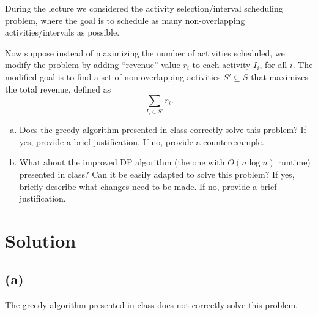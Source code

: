 \documentclass[11pt]{article}
\begin{document}
    \setlength{\headheight}{26pt}
    \pagestyle{fancy}
    \fancyfoot[C]{}
    \fancyfoot[R]{\thepage}
    \renewcommand{\headrulewidth}{0.4pt}
    \renewcommand{\footrulewidth}{0.4pt}
    

    \begin{tcolorbox}[title={Problem 1 (Interval Scheduling with Revenue, 35 pts)}] \setlength\parindent{1em}
        During the lecture we considered the activity selection/interval scheduling problem, where the goal is to schedule as many non-overlapping activities/intervals as possible. 
        
        Now suppose instead of maximizing the number of activities scheduled, we modify the problem by adding ``revenue'' value $r_i$ to each activity $I_i$, for all $i$. The modified goal is to find a set of non-overlapping activities $S'\subseteq S$ that maximizes the total revenue, defined as \[
        \sum_{I_i\in S'} r_i.\]

        \begin{enumerate}[(a)]
        \item Does the greedy algorithm presented in class correctly solve
        this problem? If yes, provide a brief justification. If no, provide a counterexample.
        \item What about the improved DP algorithm (the one with $O(n\log n)$ runtime) presented in class? Can it be easily adapted to solve this problem? If yes, briefly describe what changes need to be made. If no,  provide a brief justification.
        \end{enumerate}
            
    \end{tcolorbox}
    \section*{Solution}

    \subsection*{(a)}
    The greedy algorithm presented in class does not correctly solve this problem. 
\end{document}

